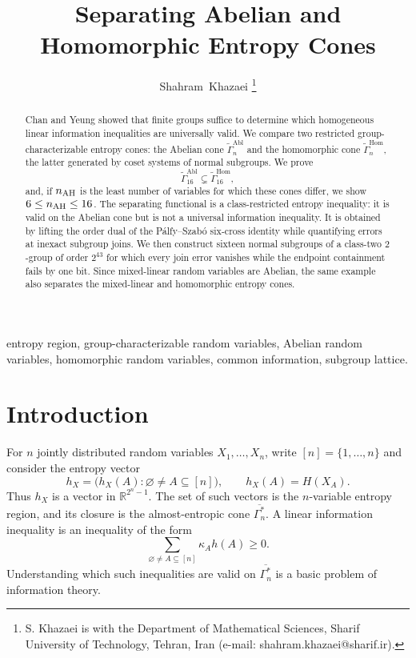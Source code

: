 \documentclass[journal]{IEEEtran}
\title{Separating Abelian and Homomorphic Entropy Cones}
\author{Shahram~Khazaei%
\thanks{S. Khazaei is with the Department of Mathematical Sciences, Sharif University of Technology, Tehran, Iran (e-mail: shahram.khazaei@sharif.ir).}}
\newcommand{\AEnt}[1][n]{\overline{\Gamma^*_{#1}}}
\newcommand{\Abl}{\widetilde\Gamma^{\mathrm{Abl}}}
\newcommand{\Hom}{\widetilde\Gamma^{\mathrm{Hom}}}
\begin{document}
\maketitle

\begin{abstract}
Chan and Yeung showed that finite groups suffice to determine which homogeneous
linear information inequalities are universally valid.  We compare two
restricted group-characterizable entropy cones: the Abelian cone $\Abl_n$ and
the homomorphic cone $\Hom_n$, the latter generated by coset systems of normal
subgroups.  We prove
\[
  \Abl_{16}\subsetneq\Hom_{16},
\]
and, if $n_{\rm AH}$ is the least number of variables for which these cones
differ, we show $6\le n_{\rm AH}\le16$.  The separating functional is a
class-restricted entropy inequality: it is valid on the Abelian cone but is not
a universal information inequality.  It is obtained by lifting the order dual
of the P\'alfy--Szab\'o six-cross identity while quantifying errors at inexact
subgroup joins.  We then construct sixteen normal subgroups of a class-two
$2$-group of order $2^{43}$ for which every join error vanishes while the
endpoint containment fails by one bit.  Since mixed-linear random variables
are Abelian, the same example also separates the mixed-linear and homomorphic
entropy cones.
\end{abstract}

\begin{IEEEkeywords}
entropy region, group-characterizable random variables, Abelian random
variables, homomorphic random variables, common information, subgroup lattice.
\end{IEEEkeywords}

\section{Introduction}\label{sec:introduction}
For $n$ jointly distributed random variables $X_1,\ldots,X_n$, write
$[n]=\{1,\ldots,n\}$ and consider the entropy vector
\[
  h_X=\bigl(h_X(A):\varnothing\ne A\subseteq[n]\bigr),
  \qquad h_X(A)=H(X_A).
\]
Thus $h_X$ is a vector in $\mathbb R^{2^n-1}$.  The set of such vectors is the
$n$-variable entropy region, and its closure is the almost-entropic cone
$\AEnt$.  A linear information inequality is an inequality of the form
\[
   \sum_{\varnothing\ne A\subseteq[n]} \kappa_A h(A)\ge0.
\]
Understanding which such inequalities are valid on $\AEnt$ is a basic problem
of information theory.
\end{document}
